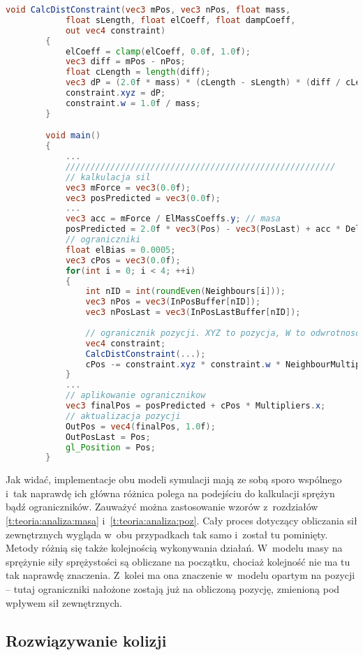 		
		\begin{lstlisting}[language=GLSL]
		void CalcDistConstraint(vec3 mPos, vec3 nPos, float mass, 
			float sLength, float elCoeff, float dampCoeff,
			out vec4 constraint)
		{
			elCoeff = clamp(elCoeff, 0.0f, 1.0f);
			vec3 diff = mPos - nPos;
			float cLength = length(diff);
			vec3 dP = (2.0f * mass) * (cLength - sLength) * (diff / cLength) * elCoeff;
			constraint.xyz = dP;
			constraint.w = 1.0f / mass;
		}

		void main()
		{
			...
			//////////////////////////////////////////////////////
			// kalkulacja sil
			vec3 mForce = vec3(0.0f);
			vec3 posPredicted = vec3(0.0f);
			...
			vec3 acc = mForce / ElMassCoeffs.y;	// masa
			posPredicted = 2.0f * vec3(Pos) - vec3(PosLast) + acc * DeltaTime * DeltaTime;
			// ograniczniki
			float elBias = 0.0005;
			vec3 cPos = vec3(0.0f);
			for(int i = 0; i < 4; ++i)
			{
				int nID = int(roundEven(Neighbours[i]));
				vec3 nPos = vec3(InPosBuffer[nID]);
				vec3 nPosLast = vec3(InPosLastBuffer[nID]);
				
				// ogranicznik pozycji. XYZ to pozycja, W to odwrotnosc masy
				vec4 constraint;
				CalcDistConstraint(...);
				cPos -= constraint.xyz * constraint.w * NeighbourMultipliers[i];
			}
			...
			// aplikowanie ogranicznikow
			vec3 finalPos = posPredicted + cPos * Multipliers.x;
			// aktualizacja pozycji
			OutPos = vec4(finalPos, 1.0f);
			OutPosLast = Pos;
			gl_Position = Pos;
		}	
		\end{lstlisting}
		
		Jak widać, implementacje obu modeli symulacji mają ze sobą sporo wspólnego i~tak naprawdę ich główna różnica polega na podejściu do kalkulacji sprężyn bądź ograniczników. Zauważyć można zastosowanie wzorów z~rozdziałów \ref{t:teoria:analiza:masa} i~\ref{t:teoria:analiza:poz}. Cały proces dotyczący obliczania sił zewnętrznych wygląda w~obu przypadkach tak samo i~został tu pominięty. Metody różnią się także kolejnością wykonywania działań. W~modelu masy na sprężynie siły sprężystości są obliczane na początku, chociaż kolejność nie ma tu tak naprawdę znaczenia. Z~kolei ma ona znaczenie w~modelu opartym na pozycji -- tutaj ograniczniki nałożone zostają już na obliczoną pozycję, zmienioną pod wpływem sił zewnętrznych.
		
		\subsection{Rozwiązywanie kolizji}
		\label{t:symulacja:dzialanie:kolizje}
			
